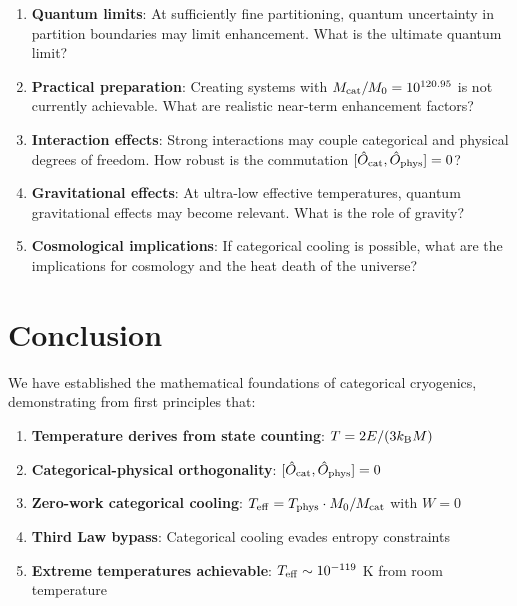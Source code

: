 \begin{enumerate}
    \item \textbf{Quantum limits}: At sufficiently fine partitioning, quantum uncertainty in partition boundaries may limit enhancement. What is the ultimate quantum limit?

    \item \textbf{Practical preparation}: Creating systems with $M_{\mathrm{cat}}/M_0 = 10^{120.95}$ is not currently achievable. What are realistic near-term enhancement factors?

    \item \textbf{Interaction effects}: Strong interactions may couple categorical and physical degrees of freedom. How robust is the commutation $[\hat{O}_{\mathrm{cat}}, \hat{O}_{\mathrm{phys}}] = 0$?

    \item \textbf{Gravitational effects}: At ultra-low effective temperatures, quantum gravitational effects may become relevant. What is the role of gravity?

    \item \textbf{Cosmological implications}: If categorical cooling is possible, what are the implications for cosmology and the heat death of the universe?
\end{enumerate}

\section{Conclusion}

We have established the mathematical foundations of categorical cryogenics, demonstrating from first principles that:

\begin{enumerate}
    \item \textbf{Temperature derives from state counting}: $T = 2E/(3k_{\mathrm{B}} M)$

    \item \textbf{Categorical-physical orthogonality}: $[\hat{O}_{\mathrm{cat}}, \hat{O}_{\mathrm{phys}}] = 0$

    \item \textbf{Zero-work categorical cooling}: $T_{\mathrm{eff}} = T_{\mathrm{phys}} \cdot M_0/M_{\mathrm{cat}}$ with $W = 0$

    \item \textbf{Third Law bypass}: Categorical cooling evades entropy constraints

    \item \textbf{Extreme temperatures achievable}: $T_{\mathrm{eff}} \sim 10^{-119}$ K from room temperature
\end{enumerate}

